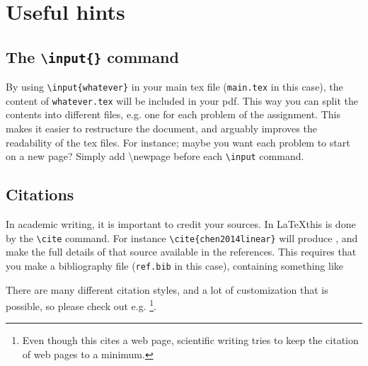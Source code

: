 \section{Useful hints}
\subsection{The \texttt{\textbackslash input\{\}} command}
By using \texttt{\textbackslash input\{whatever\}} in your main tex file (\texttt{main.tex} in this case), the content of \texttt{whatever.tex} will be included in your pdf. This way you can split the contents into different files, e.g. one for each problem of the assignment. This makes it easier to restructure the document, and arguably improves the readability of the tex files. For instance; maybe you want each problem to start on a new page? Simply add \textbackslash newpage before each \texttt{\textbackslash input} command.

\subsection{Citations}
In academic writing, it is important to credit your sources. In \LaTeX this is done by the \texttt{\textbackslash cite} command. For instance \texttt{\textbackslash cite\{chen2014linear\}} will produce \cite{chen2014linear}, and make the full details of that source available in the references. This requires that you make a bibliography file (\texttt{ref.bib} in this case), containing something like


There are many different citation styles, and a lot of customization that is possible, so please check out e.g. \cite{wikibookLatex}\footnote{Even though this cites a web page, scientific writing tries to keep the citation of web pages to a minimum.}.
